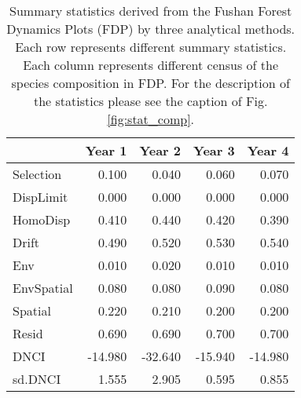 	\newpage
	\begin{longtable}{l|rrrr}
		\caption[Summary statistics derived from the Fushan Forest Dynamics Plots (FDP) by three analytical methods.]{\small
			Summary statistics derived from the Fushan Forest Dynamics Plots (FDP) by three analytical methods. Each row represents different summary statistics. Each column represents different census of the species composition in FDP. For the description of the statistics please see the caption of Fig. \ref{fig:stat_comp}.}
		\label{tbl:empirical}
		\endfirsthead
		\toprule
		\multicolumn{1}{l}{} & Year 1 & Year 2 & Year 3 & Year 4 \\ 
		\midrule
		Selection & 0.100 & 0.040 & 0.060 & 0.070 \\ 
		DispLimit & 0.000 & 0.000 & 0.000 & 0.000 \\ 
		HomoDisp & 0.410 & 0.440 & 0.420 & 0.390 \\ 
		Drift & 0.490 & 0.520 & 0.530 & 0.540 \\ 
		Env & 0.010 & 0.020 & 0.010 & 0.010 \\ 
		EnvSpatial & 0.080 & 0.080 & 0.090 & 0.080 \\ 
		Spatial & 0.220 & 0.210 & 0.200 & 0.200 \\ 
		Resid & 0.690 & 0.690 & 0.700 & 0.700 \\ 
		DNCI & -14.980 & -32.640 & -15.940 & -14.980 \\ 
		sd.DNCI & 1.555 & 2.905 & 0.595 & 0.855 \\ 
		\bottomrule
	\end{longtable}
